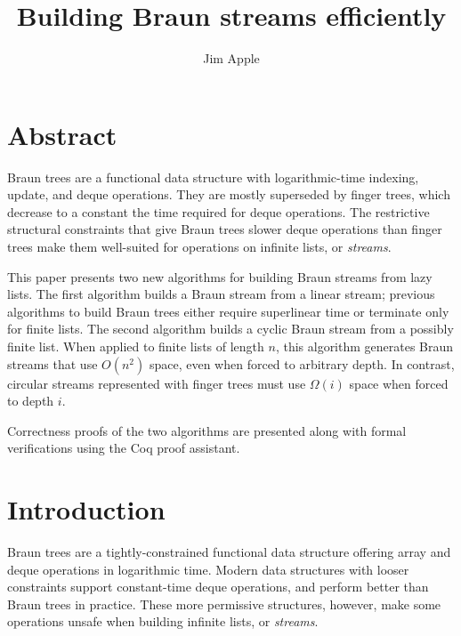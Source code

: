 \documentclass{llncs}
\begin{document}
\title{Building Braun streams efficiently}

\author{Jim Apple}

\institute{}

\maketitle

\section*{Abstract}

Braun trees are a functional data structure with logarithmic-time indexing, update, and deque operations.\cite{hoogerwoord}
They are mostly superseded by finger trees, which decrease to a constant the time required for deque operations.\cite{kaplan96purely,HinzePat}
The restrictive structural constraints that give Braun trees slower deque operations than finger trees make them well-suited for operations on infinite lists, or {\em streams}.

This paper presents two new algorithms for building Braun streams from lazy lists.
The first algorithm builds a Braun stream from a linear stream; previous algorithms to build Braun trees either require superlinear time or terminate only for finite lists.\cite{okasakiBraun} 
The second algorithm builds a cyclic Braun stream from a possibly finite list. 
When applied to finite lists of length $n$, this algorithm generates Braun streams that use $O(n^2)$ space, even when forced to arbitrary depth.
In contrast, circular streams represented with finger trees must use $\Omega(i)$ space when forced to depth $i$.

Correctness proofs of the two algorithms are presented along with formal verifications using the Coq proof assistant.

\section{Introduction}
\label{logspaceCycle}

Braun trees are a tightly-constrained functional data structure offering array and deque operations in logarithmic time.\cite{hoogerwoord,okasakiBraun} 
Modern data structures with looser constraints support constant-time deque operations, and perform better than Braun trees in practice.\cite{okasakiSkewLists}
These more permissive structures, however, make some operations unsafe when building infinite lists, or {\em streams}.
\end{document}
